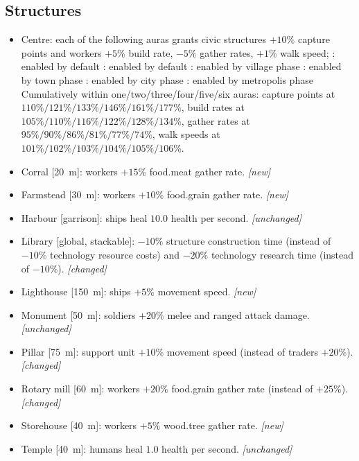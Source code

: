\documentclass{article}
\begin{document}
\subsection{Structures}
\begin{itemize}
  \item Centre: each of the following auras grants civic structures $+10\%$ capture points and workers $+5\%$ build rate, $-5\%$ gather rates, $+1\%$ walk speed;
  \subitem [25~m]: enabled by default
  \subitem [50~m]: enabled by default
  \subitem [75~m]: enabled by village phase
  \subitem [100~m]: enabled by town phase
  \subitem [125~m]: enabled by city phase
  \subitem [150~m]: enabled by metropolis phase
  \subitem Cumulatively within one/two/three/four/five/six auras: 
  \subitem capture points at $110\%/121\%/133\%/146\%/161\%/177\%$, 
  \subitem build rates at $105\%/110\%/116\%/122\%/128\%/134\%$,
  \subitem gather rates at $95\%/90\%/86\%/81\%/77\%/74\%$,
  \subitem walk speeds at $101\%/102\%/103\%/104\%/105\%/106\%$.
  \item Corral [20~m]: workers $+15\%$ food.meat gather rate. \emph{[new]}
  \item Farmstead [30~m]: workers $+10\%$ food.grain gather rate. \emph{[new]}
  \item Harbour [garrison]: ships heal $10.0$ health per second. \emph{[unchanged]}
  \item Library [global, stackable]: $-10\%$ structure construction time (instead of $-10\%$ technology resource costs) and $-20\%$ technology research time (instead of $-10\%$). \emph{[changed]}
  \item Lighthouse [150~m]: ships $+5\%$ movement speed. \emph{[new]}
  \item Monument [50~m]: soldiers $+20\%$ melee and ranged attack damage. \emph{[unchanged]}
  \item Pillar [75~m]: support unit $+10\%$ movement speed (instead of traders $+20\%$). \emph{[changed]}
  \item Rotary mill [60~m]: workers $+20\%$ food.grain gather rate (instead of $+25\%$). \emph{[changed]}
  \item Storehouse [40~m]: workers $+5\%$ wood.tree gather rate. \emph{[new]}
  \item Temple [40~m]: humans heal $1.0$ health per second. \emph{[unchanged]}

\end{itemize}
\end{document}
